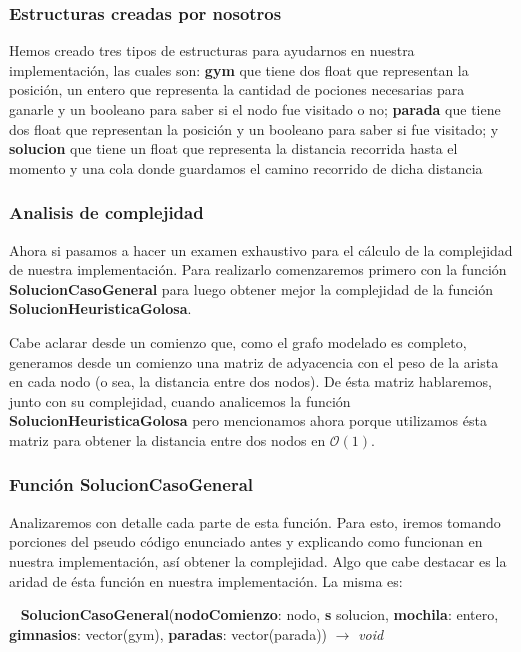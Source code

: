 \subsubsection{Estructuras creadas por nosotros}

Hemos creado tres tipos de estructuras para ayudarnos en nuestra implementación, las cuales son: \textbf{gym} que tiene dos float que representan la posición, un entero que representa la cantidad de pociones necesarias para ganarle y un booleano para saber si el nodo fue visitado o no; \textbf{parada} que tiene dos float que representan la posición y un booleano para saber si fue visitado; y \textbf{solucion} que tiene un float que representa la distancia recorrida hasta el momento y una cola donde guardamos el camino recorrido de dicha distancia


\subsubsection{Analisis de complejidad}


Ahora si pasamos a hacer un examen exhaustivo para el cálculo de la complejidad de nuestra implementación. Para realizarlo comenzaremos primero con la función \textbf{SolucionCasoGeneral} para luego obtener mejor la complejidad de la función \textbf{SolucionHeuristicaGolosa}.

Cabe aclarar desde un comienzo que, como el grafo modelado es completo, generamos desde un comienzo una matriz de adyacencia con el peso de la arista en cada nodo (o sea, la distancia entre dos nodos). De ésta matriz hablaremos, junto con su complejidad, cuando analicemos la función \textbf{SolucionHeuristicaGolosa} pero mencionamos ahora porque utilizamos ésta matriz para obtener la distancia entre dos nodos en $\mathcal{O}(1)$.


\subsubsection{Función SolucionCasoGeneral}

Analizaremos con detalle cada parte de esta función. Para esto, iremos tomando porciones del pseudo código enunciado antes y explicando como funcionan en nuestra implementación, así obtener la complejidad. Algo que cabe destacar es la aridad de ésta función en nuestra implementación. La misma es: 

~
\textbf{SolucionCasoGeneral}(\textbf{nodoComienzo}: nodo, \textbf{s} solucion, \textbf{mochila}: entero, \textbf{gimnasios}: vector(gym), \textbf{paradas}: vector(parada)) $\rightarrow$ \textit{void}
~

